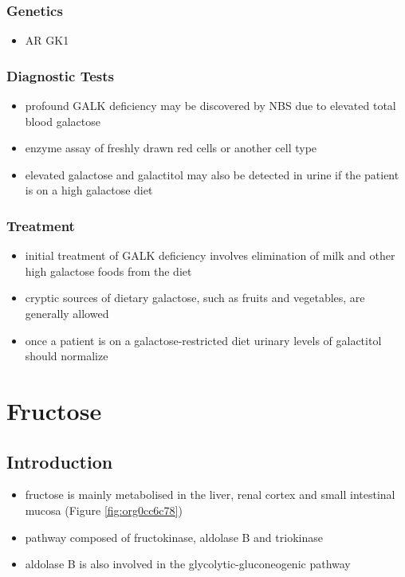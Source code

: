 \documentclass{scrartcl}
\begin{document}
\subsubsection{Genetics}
\label{sec:org94c3489}
\begin{itemize}
\item AR GK1
\end{itemize}
\subsubsection{Diagnostic Tests}
\label{sec:org39526d8}
\begin{itemize}
\item profound GALK deficiency may be discovered by NBS due to elevated total blood galactose
\item enzyme assay of freshly drawn red cells or another cell type
\item elevated galactose and galactitol may also be detected in urine if
the patient is on a high galactose diet
\end{itemize}

\subsubsection{Treatment}
\label{sec:org42a8509}
\begin{itemize}
\item initial treatment of GALK deficiency involves elimination of milk
and other high galactose foods from the diet
\item cryptic sources of dietary galactose, such as fruits and vegetables,
are generally allowed
\item once a patient is on a galactose-restricted diet urinary levels of
galactitol should normalize
\end{itemize}
\section{Fructose}
\label{sec:org3774b71}
\subsection{Introduction}
\label{sec:orga0c98df}
\begin{itemize}
\item fructose is mainly metabolised in the liver, renal cortex and small
intestinal mucosa (Figure \ref{fig:org0cc6c78})
\item pathway composed of fructokinase, aldolase B and triokinase
\item aldolase B is also involved in the glycolytic-gluconeogenic pathway
\end{itemize}
\end{document}

